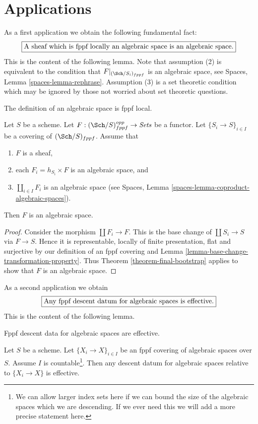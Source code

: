 \section{Applications}
\label{section-applications}

\noindent
As a first application we obtain the following fundamental fact:
$$
\fbox{A sheaf which is fppf locally an algebraic space is an algebraic space.}
$$
This is the content of the following lemma.
Note that assumption (2) is equivalent to the condition that
$F|_{(\Sch/S_i)_{fppf}}$ is an algebraic space, see
Spaces, Lemma \ref{spaces-lemma-rephrase}.
Assumption (3) is a set theoretic condition which may be ignored
by those not worried about set theoretic questions.

\begin{lemma}
\label{lemma-locally-algebraic-space}
\begin{slogan}
The definition of an algebraic space is fppf local.
\end{slogan}
Let $S$ be a scheme.
Let $F : (\Sch/S)_{fppf}^{opp} \to \textit{Sets}$ be a functor.
Let $\{S_i \to S\}_{i \in I}$ be a covering of $(\Sch/S)_{fppf}$.
Assume that
\begin{enumerate}
\item $F$ is a sheaf,
\item each $F_i = h_{S_i} \times F$ is an algebraic space, and
\item $\coprod_{i \in I} F_i$ is an algebraic space (see
Spaces, Lemma \ref{spaces-lemma-coproduct-algebraic-spaces}).
\end{enumerate}
Then $F$ is an algebraic space.
\end{lemma}

\begin{proof}
Consider the morphism $\coprod F_i \to F$. This is the base change
of $\coprod S_i \to S$ via $F \to S$. Hence it is representable,
locally of finite presentation, flat and surjective by our definition
of an fppf covering and
Lemma \ref{lemma-base-change-transformation-property}.
Thus
Theorem \ref{theorem-final-bootstrap}
applies to show that $F$ is an algebraic space.
\end{proof}

\noindent
As a second application we obtain
$$
\fbox{Any fppf descent datum for algebraic spaces is effective.}
$$
This is the content of the following lemma.

\begin{lemma}
\label{lemma-descend-algebraic-space}
\begin{slogan}
Fppf descent data for algebraic spaces are effective.
\end{slogan}
Let $S$ be a scheme. Let $\{X_i \to X\}_{i \in I}$ be an fppf
covering of algebraic spaces over $S$. Assume $I$ is
countable\footnote{We can allow larger index sets here if
we can bound the size of the algebraic spaces which we are descending.
If we ever need this we will add a more precise statement here.}.
Then any descent datum for algebraic spaces relative to
$\{X_i \to X\}$ is effective.
\end{lemma}


